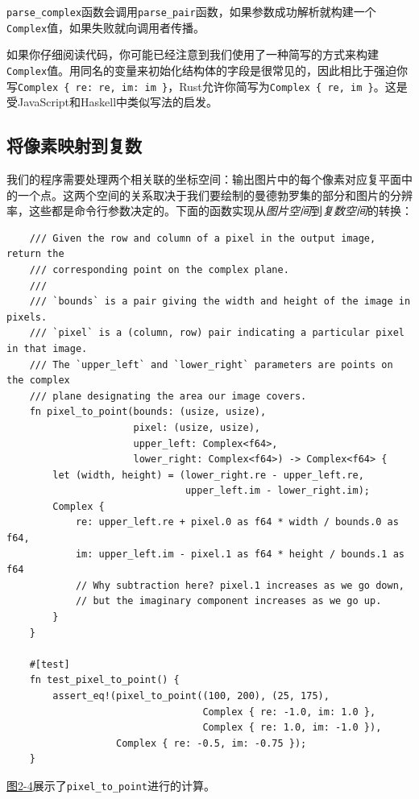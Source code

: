 \texttt{parse\_complex}函数会调用\texttt{parse\_pair}函数，如果参数成功解析就构建一个\texttt{Complex}值，如果失败就向调用者传播。

如果你仔细阅读代码，你可能已经注意到我们使用了一种简写的方式来构建\texttt{Complex}值。用同名的变量来初始化结构体的字段是很常见的，因此相比于强迫你写\texttt{Complex \{ re: re, im: im \}}，Rust允许你简写为\texttt{Complex \{ re, im \}}。这是受JavaScript和Haskell中类似写法的启发。

\subsection{将像素映射到复数}
我们的程序需要处理两个相关联的坐标空间：输出图片中的每个像素对应复平面中的一个点。这两个空间的关系取决于我们要绘制的曼德勃罗集的部分和图片的分辨率，这些都是命令行参数决定的。下面的函数实现从\emph{图片空间}到\emph{复数空间}的转换：
\begin{verbatim}
    /// Given the row and column of a pixel in the output image, return the
    /// corresponding point on the complex plane.
    ///
    /// `bounds` is a pair giving the width and height of the image in pixels.
    /// `pixel` is a (column, row) pair indicating a particular pixel in that image.
    /// The `upper_left` and `lower_right` parameters are points on the complex
    /// plane designating the area our image covers.
    fn pixel_to_point(bounds: (usize, usize),
                      pixel: (usize, usize),
                      upper_left: Complex<f64>,
                      lower_right: Complex<f64>) -> Complex<f64> {
        let (width, height) = (lower_right.re - upper_left.re,
                               upper_left.im - lower_right.im);
        Complex {
            re: upper_left.re + pixel.0 as f64 * width / bounds.0 as f64,
            im: upper_left.im - pixel.1 as f64 * height / bounds.1 as f64
            // Why subtraction here? pixel.1 increases as we go down,
            // but the imaginary component increases as we go up.
        }
    }

    #[test]
    fn test_pixel_to_point() {
        assert_eq!(pixel_to_point((100, 200), (25, 175),
                                  Complex { re: -1.0, im: 1.0 },
                                  Complex { re: 1.0, im: -1.0 }),
                   Complex { re: -0.5, im: -0.75 });
    }
\end{verbatim}

\hyperref[f2-4]{图2-4}展示了\texttt{pixel\_to\_point}进行的计算。

